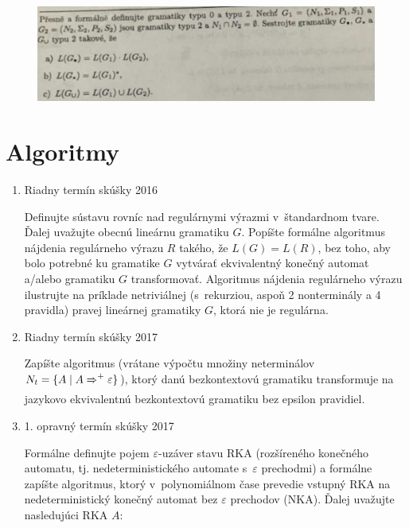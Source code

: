 \documentclass[]{article}
\begin{document}
	\begin{figure}[H]
		\includegraphics[width=\textwidth]{tasks/bezkontextove/task14.png}
	\end{figure}

	\section{Algoritmy}
	
	\begin{enumerate}
		\item Riadny termín skúšky 2016
		
		Definujte sústavu rovníc nad regulárnymi výrazmi v~štandardnom tvare. Ďalej uvažujte obecnú lineárnu gramatiku $G$. Popíšte formálne algoritmus nájdenia regulárneho výrazu $R$ takého, že $L(G) = L(R)$, bez toho, aby bolo potrebné ku gramatike $G$ vytvárať ekvivalentný konečný automat a/alebo gramatiku $G$ transformovať. Algoritmus nájdenia regulárneho výrazu ilustrujte na príklade netriviálnej (s~rekurziou, aspoň 2 nonterminály a 4 pravidla) pravej lineárnej gramatiky $G$, ktorá nie je regulárna.
		
		\item Riadny termín skúšky 2017
		
		Zapíšte algoritmus (vrátane výpočtu množiny neterminálov $N_t = \{ A \mid A \xRightarrow{}^+ \varepsilon\}$), ktorý danú bezkontextovú gramatiku transformuje na jazykovo ekvivalentnú bezkontextovú gramatiku bez epsilon pravidiel.
		
		\item 1. opravný termín skúšky 2017
		
		Formálne definujte pojem $\varepsilon$-uzáver stavu RKA (rozšíreného konečného automatu, tj. nedeterministického automate s~$\varepsilon$ prechodmi) a formálne zapíšte algoritmus, ktorý v~polynomiálnom čase prevedie vstupný RKA na nedeterministický konečný automat bez $\varepsilon$ prechodov (NKA). Ďalej uvažujte nasledujúci RKA $A$:
		

\end{enumerate}
\end{document}

